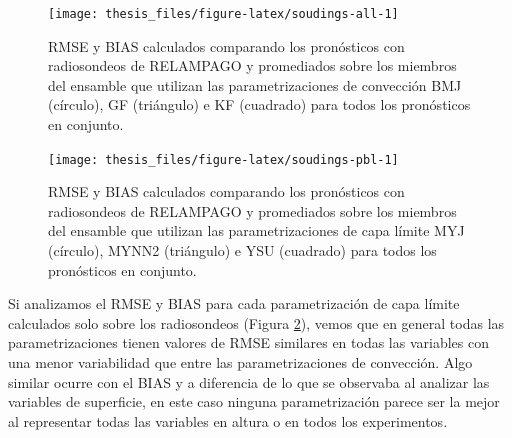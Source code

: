 \documentclass[12pt,oneside,a4paper]{reedthesis}
\begin{document}
\begin{figure}

{\centering \texttt{[image: thesis\_files/figure-latex/soudings-all-1]} 

}

\caption{RMSE y BIAS calculados comparando los pronósticos con radiosondeos de RELAMPAGO y promediados sobre los miembros del ensamble que utilizan las parametrizaciones de convección BMJ (círculo), GF (triángulo) e KF (cuadrado) para todos los pronósticos en conjunto.}\label{fig:soudings-all}
\end{figure}

\begin{figure}

{\centering \texttt{[image: thesis\_files/figure-latex/soudings-pbl-1]} 

}

\caption{RMSE y BIAS calculados comparando los pronósticos con radiosondeos de RELAMPAGO y promediados sobre los miembros del ensamble que utilizan las parametrizaciones de capa límite MYJ (círculo), MYNN2 (triángulo) e YSU (cuadrado) para todos los pronósticos en conjunto.}\label{fig:soudings-pbl}
\end{figure}
Si analizamos el RMSE y BIAS para cada parametrización de capa límite calculados solo sobre los radiosondeos (Figura \ref{fig:soudings-pbl}), vemos que en general todas las parametrizaciones tienen valores de RMSE similares en todas las variables con una menor variabilidad que entre las parametrizaciones de convección. Algo similar ocurre con el BIAS y a diferencia de lo que se observaba al analizar las variables de superficie, en este caso ninguna parametrización parece ser la mejor al representar todas las variables en altura o en todos los experimentos.
\end{document}
